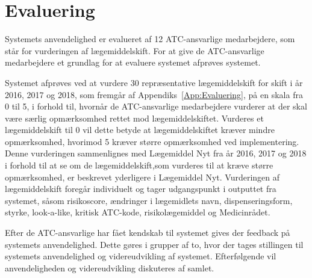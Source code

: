 \section{Evaluering}
Systemets anvendelighed er evalueret af 12 ATC-ansvarlige medarbejdere, som står for vurderingen af lægemiddelskift. For at give de ATC-ansvarlige medarbejdere et grundlag for at evaluere systemet afprøves systemet.

Systemet afprøves ved at vurdere 30 repræsentative lægemiddelskift for skift i år 2016, 2017 og 2018, som fremgår af Appendiks~\ref{App:Evaluering}, på en skala fra 0 til 5, i forhold til, hvornår de ATC-ansvarlige medarbejdere vurderer at der skal være særlig opmærksomhed rettet mod lægemiddelskiftet. Vurderes et lægemiddelskift til 0 vil dette betyde at lægemiddelskiftet kræver mindre opmærksomhed, hvorimod 5 kræver større opmærksomhed ved implementering. Denne vurderingen sammenlignes med Lægemiddel Nyt fra år 2016, 2017 og 2018 i forhold til at se om de lægemiddelskift,som vurderes til at kræve større opmærksomhed, er beskrevet yderligere i Lægemiddel Nyt. Vurderingen af lægemiddelskift foregår individuelt og tager udgangspunkt i outputtet fra systemet, såsom risikoscore, ændringer i lægemidlets navn, dispenseringsform, styrke, look-a-like, kritisk ATC-kode, risikolægemiddel og Medicinrådet. 

Efter de ATC-ansvarlige har fået kendskab til systemet gives der feedback på systemets anvendelighed. Dette gøres i grupper af to, hvor der tages stillingen til systemets anvendelighed og videreudvikling af systemet. Efterfølgende vil anvendeligheden og videreudvikling diskuteres af samlet. 





